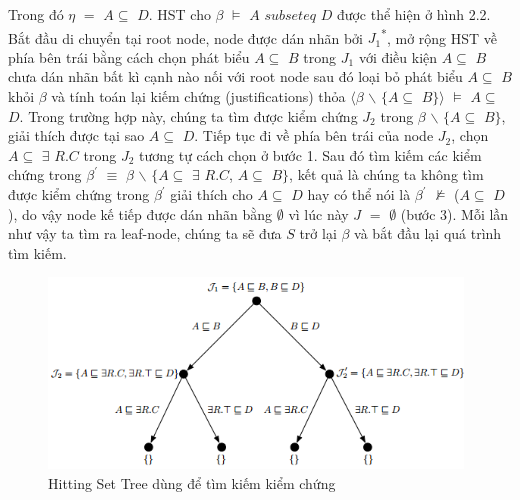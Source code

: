 		Trong đó $\eta$ $=$ $A\subseteq$ $D$. HST cho $\beta$ $\models$ $A$ $subseteq$ $D$ được thể hiện ở hình 2.2. Bắt đầu di chuyển tại root node, node được dán nhãn bởi $J_{1}$\textsuperscript{*}, mở rộng HST về phía bên trái bằng cách chọn phát biểu $A\subseteq$ $B$ trong $J_{1}$ với điều kiện $A\subseteq$ $B$ chưa dán nhãn bất kì cạnh nào nối với root node sau đó loại bỏ phát biểu $A\subseteq$ $B$ khỏi $\beta$ và tính toán lại kiếm chứng (justifications) thỏa $\langle\beta$ $\backslash$ $\{A\subseteq$ $B\}\rangle$ $\models$ $A\subseteq$ $D$. Trong trường hợp này, chúng ta tìm được kiểm chứng $J_{2}$ trong $\beta$ $\backslash$ $\{A\subseteq$ $B\}$, giải thích được tại sao $A\subseteq$ $D$. Tiếp tục đi về phía bên trái của node $J_{2}$, chọn $A\subseteq$ $\exists$ $R.C$ trong $J_{2}$ tương tự cách chọn ở bước 1. Sau đó tìm kiếm các kiểm chứng trong $\beta^{'}$ $\equiv$ $\beta$ $\backslash$ $\{A\subseteq$ $\exists$ $R.C$, $A\subseteq$ $B\}$, kết quả là chúng ta không tìm được kiểm chứng trong $\beta^{'}$ giải thích cho $A\subseteq$ $D$ hay có thể nói là $\beta^{'}$ $\not\models$ ($A\subseteq$ $D$), do vậy node kế tiếp được dán nhãn bằng $\emptyset$ vì lúc này $J$ $=$ $\emptyset$ (bước 3). Mỗi lần như vậy ta tìm ra leaf-node, chúng ta sẽ đưa $S$ trở lại $\beta$ và bắt đầu lại quá trình tìm kiếm.
		\begin{figure}[ht!]
			\centering
			\includegraphics[width=110mm]{Figures/fig2.png}
			\caption{Hitting Set Tree dùng để tìm kiếm kiểm chứng \label{overflow}}
		\end{figure}

